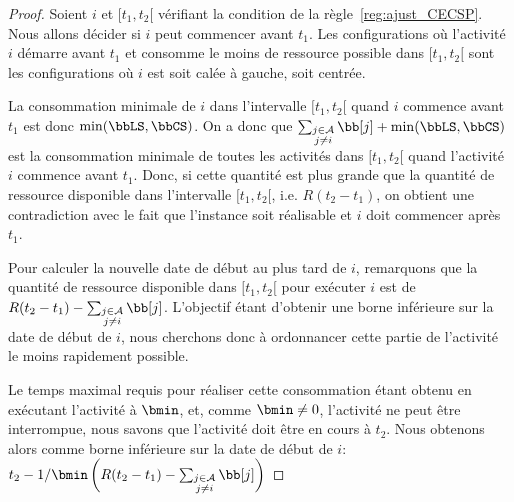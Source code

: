 \begin{proof}
  Soient $i$ et $[t_1,t_2[$ vérifiant la condition de la
  règle~\ref{reg:ajust_CECSP}. Nous allons décider si $i$ peut commencer
  avant $t_1$. Les configurations où l'activité $i$ démarre avant $t_1$
  et consomme le moins de ressource possible dans $[t_1,t_2[$ sont les
  configurations où $i$ est soit calée à gauche, soit centrée.

  La consommation minimale de $i$ dans l'intervalle $[t_1,t_2[$ quand
  $i$ commence avant $t_1$ est donc $\min( \bbLS, \bbCS)$. On a donc que
  $\sum_{\substack{j \in \A\\ j\neq i}} \bb[j] + \min( \bbLS, \bbCS) $
  est la consommation minimale de toutes les activités dans $[t_1,t_2[$
  quand l'activité $i$ commence avant $t_1$. Donc, si cette quantité est
  plus grande que la quantité de ressource disponible dans l'intervalle
  $[t_1,t_2[$, i.e. $R(t_2-t_1)$, on obtient une contradiction avec le
  fait que l'instance soit réalisable et $i$ doit commencer après $t_1$.

  Pour calculer la nouvelle date de début au plus tard de $i$,
  remarquons que la quantité de ressource disponible dans $[t_1,t_2[$
  pour exécuter $i$ est de $R(t_2-t_1) -\sum_{\substack{j \in \A\\
      j\neq i}} \bb[j]$. L'objectif étant d'obtenir une borne inférieure sur la date de
  début de $i$, nous cherchons donc à ordonnancer cette partie de
  l'activité le moins rapidement possible. 

  Le temps maximal requis pour réaliser cette consommation étant
  obtenu en exécutant l'activité à $\bmin$, et, comme $\bmin \neq 0$,
  l'activité ne peut être interrompue, nous savons que l'activité doit
  être en cours à $t_2$. Nous obtenons alors comme borne inférieure sur
  la date de début de $i$:
  $t_2 - 1/\bmin \left(R (t_2-t_1) -\sum_{\substack{j
        \in \A \\ j \neq i}} \bb[j] \right) $
\end{proof}

